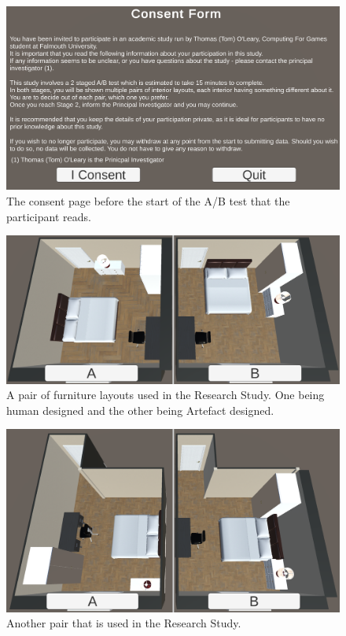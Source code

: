 \begin{figure}[!h]
    \includegraphics[width=\columnwidth]{./Images/consent-form.png}
    \centering
    \caption{The consent page before the start of the A/B test that the participant reads.}
    \label{consent-screen}
\end{figure}
\begin{figure}[!h]
    \includegraphics[width=\columnwidth]{./Images/pair-3.png}
    \centering
    \caption{A pair of furniture layouts used in the Research Study. One being human designed and the other being Artefact designed.}
    \label{pair-example-1}
\end{figure}
\begin{figure}[!h]
    \includegraphics[width=\columnwidth]{./Images/pair-1.png}
    \centering
    \caption{Another pair that is used in the Research Study.}
    \label{pair-example-2}
\end{figure}
